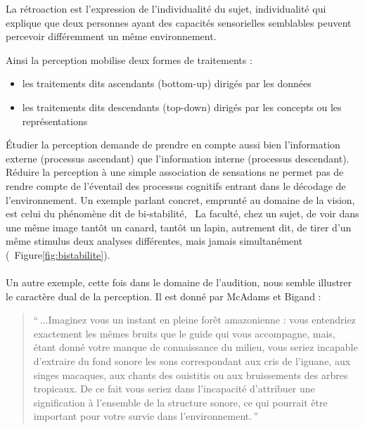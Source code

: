 La rétroaction est l'expression de l'individualité du sujet, individualité qui explique que deux personnes ayant des capacités sensorielles semblables peuvent percevoir différemment un même environnement.

Ainsi la perception mobilise deux formes de traitements :

\begin{itemize}
\item les traitements dits ascendants (bottom-up) dirigés par les données
\item les traitements dits descendants (top-down) dirigés par les concepts ou les représentations
\end{itemize}

Étudier la perception demande de prendre en compte aussi bien l'information externe (processus ascendant) que l'information interne (processus descendant). Réduire la perception à une simple association de sensations ne permet pas de rendre compte de l'éventail des processus cognitifs entrant dans le décodage de l'environnement. Un exemple parlant concret, emprunté au domaine de la vision, est celui du phénomène dit de bi-stabilité, \ie~La faculté, chez un sujet, de voir dans une même image tantôt un canard, tantôt un lapin, autrement dit, de tirer d'un même stimulus deux analyses différentes, mais jamais simultanément (\Cf~Figure\ref{fig:bistabilite}). \\

\\

Un autre exemple, cette fois dans le domaine de l'audition, nous semble illustrer le caractère dual de la perception. Il est donné par McAdams et Bigand \citep[p. 2]{mcadams1994penser}:

\begin{quote}
``\,...Imaginez vous un instant en pleine forêt amazonienne : vous entendriez exactement les mêmes bruits que le guide qui vous accompagne, mais, étant donné votre manque de connaissance du milieu, vous seriez incapable d'extraire du fond sonore les sons correspondant aux cris de l'iguane, aux singes macaques, aux chants des ouistitis ou aux bruissements des arbres tropicaux. De ce fait vous seriez dans l'incapacité d'attribuer une signification à l'ensemble de la structure sonore, ce qui pourrait être important pour votre survie dans l'environnement.\,''
\end{quote}


